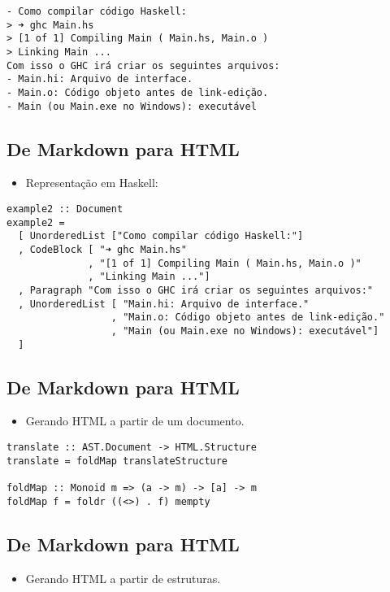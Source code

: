 \documentclass[11pt]{article}
\begin{document}
\begin{verbatim}
- Como compilar código Haskell:
> ➜ ghc Main.hs
> [1 of 1] Compiling Main ( Main.hs, Main.o )
> Linking Main ...
Com isso o GHC irá criar os seguintes arquivos:
- Main.hi: Arquivo de interface.
- Main.o: Código objeto antes de link-edição.
- Main (ou Main.exe no Windows): executável
\end{verbatim}
\subsection*{De Markdown para HTML}
\label{sec:org6f80024}

\begin{itemize}
\item Representação em Haskell:
\end{itemize}

\begin{verbatim}
example2 :: Document
example2 =
  [ UnorderedList ["Como compilar código Haskell:"]
  , CodeBlock [ "➜ ghc Main.hs"
              , "[1 of 1] Compiling Main ( Main.hs, Main.o )"
              , "Linking Main ..."]
  , Paragraph "Com isso o GHC irá criar os seguintes arquivos:"
  , UnorderedList [ "Main.hi: Arquivo de interface."
                  , "Main.o: Código objeto antes de link-edição."
                  , "Main (ou Main.exe no Windows): executável"]
  ]
\end{verbatim}
\subsection*{De Markdown para HTML}
\label{sec:org82db6fe}

\begin{itemize}
\item Gerando HTML a partir de um documento.
\end{itemize}

\begin{verbatim}
translate :: AST.Document -> HTML.Structure
translate = foldMap translateStructure

foldMap :: Monoid m => (a -> m) -> [a] -> m
foldMap f = foldr ((<>) . f) mempty
\end{verbatim}
\subsection*{De Markdown para HTML}
\label{sec:org1f0fb1d}

\begin{itemize}
\item Gerando HTML a partir de estruturas.
\end{itemize}
\end{document}
